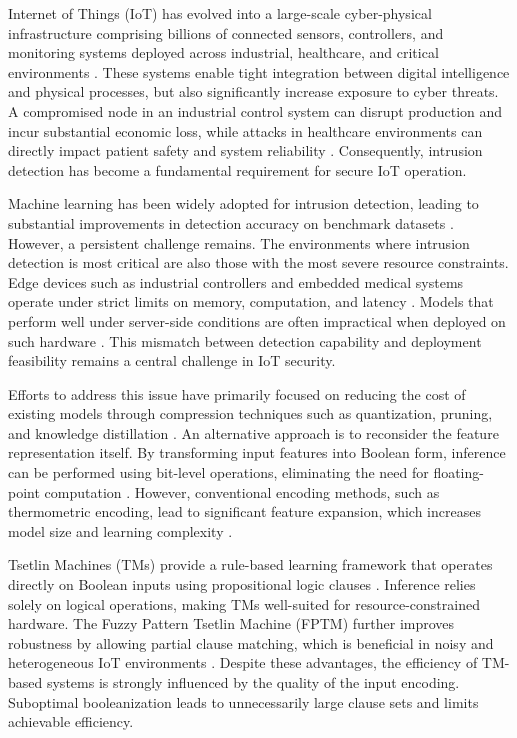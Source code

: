 \documentclass[journal,twoside,web]{ieeecolor}
\begin{document}
 Internet of Things (IoT) has evolved into a large-scale cyber-physical infrastructure comprising billions of connected sensors, controllers, and monitoring systems deployed across industrial, healthcare, and critical environments \cite{hussain2020ml, algaradi2020survey}. These systems enable tight integration between digital intelligence and physical processes, but also significantly increase exposure to cyber threats. A compromised node in an industrial control system can disrupt production and incur substantial economic loss, while attacks in healthcare environments can directly impact patient safety and system reliability \cite{zhukabayeva2025cybersecurity}. Consequently, intrusion detection has become a fundamental requirement for secure IoT operation.

Machine learning has been widely adopted for intrusion detection, leading to substantial improvements in detection accuracy on benchmark datasets \cite{kikissagbe2024review, jouhari2024lightweight}. However, a persistent challenge remains. The environments where intrusion detection is most critical are also those with the most severe resource constraints. Edge devices such as industrial controllers and embedded medical systems operate under strict limits on memory, computation, and latency \cite{wang2023lightweight}. Models that perform well under server-side conditions are often impractical when deployed on such hardware \cite{kundu2025review}. This mismatch between detection capability and deployment feasibility remains a central challenge in IoT security.

Efforts to address this issue have primarily focused on reducing the cost of existing models through compression techniques such as
quantization, pruning, and knowledge distillation \cite{liu2025compression}. An alternative approach is to reconsider the feature representation itself. By transforming input features into Boolean form, inference can be performed using bit-level operations,
eliminating the need for floating-point computation \cite{bacellar2017thermometer}. However, conventional encoding methods,
such as thermometric encoding, lead to significant feature expansion, which increases model size and learning complexity \cite{nguyen2025binarized}.

Tsetlin Machines (TMs) provide a rule-based learning framework that operates directly on Boolean inputs using propositional logic clauses
\cite{granmo2018tsetlin}. Inference relies solely on logical operations, making TMs well-suited for resource-constrained hardware.
The Fuzzy Pattern Tsetlin Machine (FPTM) further improves robustness by allowing partial clause matching, which is beneficial in noisy and
heterogeneous IoT environments \cite{hnilov2025fptm}. Despite these advantages, the efficiency of TM-based systems is strongly influenced
by the quality of the input encoding. Suboptimal booleanization leads to unnecessarily large clause sets and limits achievable efficiency.
\end{document}
